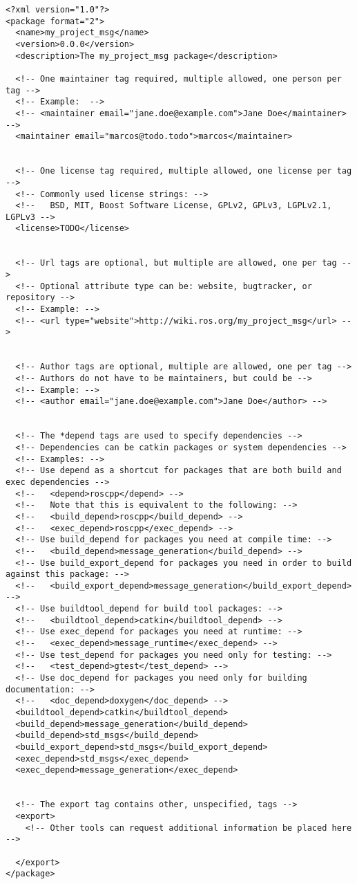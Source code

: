 \documentclass[letterpaper]{article}
\begin{document}
\begin{lstlisting}[style=xmlstyle, title=src/my\_project\_msg/package.xml]
<?xml version="1.0"?>
<package format="2">
  <name>my_project_msg</name>
  <version>0.0.0</version>
  <description>The my_project_msg package</description>

  <!-- One maintainer tag required, multiple allowed, one person per tag -->
  <!-- Example:  -->
  <!-- <maintainer email="jane.doe@example.com">Jane Doe</maintainer> -->
  <maintainer email="marcos@todo.todo">marcos</maintainer>


  <!-- One license tag required, multiple allowed, one license per tag -->
  <!-- Commonly used license strings: -->
  <!--   BSD, MIT, Boost Software License, GPLv2, GPLv3, LGPLv2.1, LGPLv3 -->
  <license>TODO</license>


  <!-- Url tags are optional, but multiple are allowed, one per tag -->
  <!-- Optional attribute type can be: website, bugtracker, or repository -->
  <!-- Example: -->
  <!-- <url type="website">http://wiki.ros.org/my_project_msg</url> -->


  <!-- Author tags are optional, multiple are allowed, one per tag -->
  <!-- Authors do not have to be maintainers, but could be -->
  <!-- Example: -->
  <!-- <author email="jane.doe@example.com">Jane Doe</author> -->


  <!-- The *depend tags are used to specify dependencies -->
  <!-- Dependencies can be catkin packages or system dependencies -->
  <!-- Examples: -->
  <!-- Use depend as a shortcut for packages that are both build and exec dependencies -->
  <!--   <depend>roscpp</depend> -->
  <!--   Note that this is equivalent to the following: -->
  <!--   <build_depend>roscpp</build_depend> -->
  <!--   <exec_depend>roscpp</exec_depend> -->
  <!-- Use build_depend for packages you need at compile time: -->
  <!--   <build_depend>message_generation</build_depend> -->
  <!-- Use build_export_depend for packages you need in order to build against this package: -->
  <!--   <build_export_depend>message_generation</build_export_depend> -->
  <!-- Use buildtool_depend for build tool packages: -->
  <!--   <buildtool_depend>catkin</buildtool_depend> -->
  <!-- Use exec_depend for packages you need at runtime: -->
  <!--   <exec_depend>message_runtime</exec_depend> -->
  <!-- Use test_depend for packages you need only for testing: -->
  <!--   <test_depend>gtest</test_depend> -->
  <!-- Use doc_depend for packages you need only for building documentation: -->
  <!--   <doc_depend>doxygen</doc_depend> -->
  <buildtool_depend>catkin</buildtool_depend>
  <build_depend>message_generation</build_depend>
  <build_depend>std_msgs</build_depend>
  <build_export_depend>std_msgs</build_export_depend>
  <exec_depend>std_msgs</exec_depend>
  <exec_depend>message_generation</exec_depend>


  <!-- The export tag contains other, unspecified, tags -->
  <export>
    <!-- Other tools can request additional information be placed here -->

  </export>
</package>

\end{lstlisting}
\end{document}
